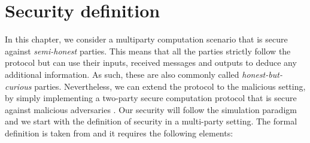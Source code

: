 



\section{Security definition} \label{secDefition}

In this chapter, we consider a multiparty computation scenario that is secure against \textit{semi-honest} parties. This means that all the parties strictly follow the protocol but can use their inputs, received messages and outputs to deduce any additional information. As such, these are also commonly called \textit{honest-but-curious} parties. Nevertheless, we can extend the protocol to the malicious setting, by simply implementing a two-party secure computation protocol that is secure against malicious adversaries \cite{Evans2018}. Our security will follow the simulation paradigm and we start with the definition of security in a multi-party setting. The formal definition is taken from \cite{Evans2018} and it requires the following elements:

